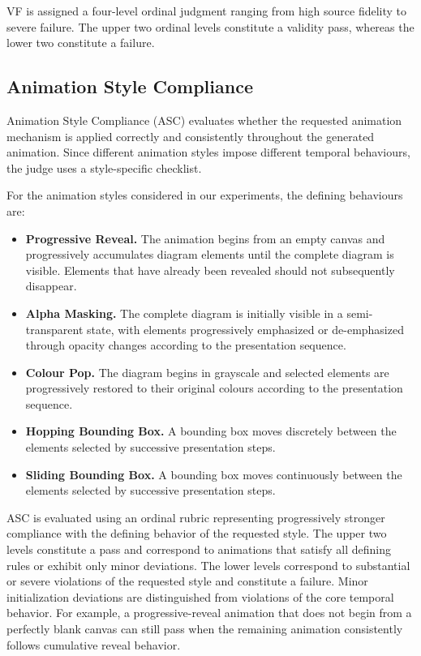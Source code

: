 \documentclass{article} %
\begin{document}
VF is assigned a four-level ordinal judgment ranging from high source fidelity
to severe failure. The upper two ordinal levels constitute a validity pass,
whereas the lower two constitute a failure.

\subsection{Animation Style Compliance}
\label{sec:supp_asc}

Animation Style Compliance (ASC) evaluates whether the requested animation
mechanism is applied correctly and consistently throughout the generated
animation. Since different animation styles impose different temporal
behaviours, the judge uses a style-specific checklist.

For the animation styles considered in our experiments, the defining
behaviours are:

\begin{itemize}
    \item \textbf{Progressive Reveal.}
    The animation begins from an empty canvas and progressively accumulates
    diagram elements until the complete diagram is visible. Elements that
    have already been revealed should not subsequently disappear.

    \item \textbf{Alpha Masking.}
    The complete diagram is initially visible in a semi-transparent state,
    with elements progressively emphasized or de-emphasized through opacity
    changes according to the presentation sequence.

    \item \textbf{Colour Pop.}
    The diagram begins in grayscale and selected elements are progressively
    restored to their original colours according to the presentation sequence.

    \item \textbf{Hopping Bounding Box.}
    A bounding box moves discretely between the elements selected by
    successive presentation steps.

    \item \textbf{Sliding Bounding Box.}
    A bounding box moves continuously between the elements selected by
    successive presentation steps.
\end{itemize}

ASC is evaluated using an ordinal rubric representing progressively stronger
compliance with the defining behavior of the requested style. The upper two
levels constitute a pass and correspond to animations that satisfy all
defining rules or exhibit only minor deviations. The lower levels correspond
to substantial or severe violations of the requested style and constitute a
failure. Minor initialization deviations are distinguished from violations of
the core temporal behavior. For example, a progressive-reveal animation that
does not begin from a perfectly blank canvas can still pass when the remaining
animation consistently follows cumulative reveal behavior.
\end{document}
